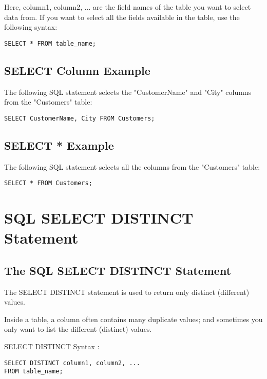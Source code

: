 \documentclass[a4paper,12pt]{article}
\begin{document}
Here, column1, column2, ... are the field names of the table you want to select data from. If you want to select all the fields available in the table, use the following syntax:


\begin{lstlisting}
SELECT * FROM table_name;
\end{lstlisting}



\subsection{SELECT Column Example}

The following SQL statement selects the "CustomerName" and "City" columns from the "Customers" table:


\begin{lstlisting}
SELECT CustomerName, City FROM Customers;
\end{lstlisting}


\subsection{SELECT * Example}

The following SQL statement selects all the columns from the "Customers" table:

\begin{lstlisting}
SELECT * FROM Customers;
\end{lstlisting}



\section{SQL SELECT DISTINCT Statement}

\subsection{The SQL SELECT DISTINCT Statement}

The SELECT DISTINCT statement is used to return only distinct (different) values.

Inside a table, a column often contains many duplicate values; and sometimes you only want to list the different (distinct) values.

SELECT DISTINCT Syntax :

\begin{lstlisting}
SELECT DISTINCT column1, column2, ...
FROM table_name;
\end{lstlisting}
\end{document}
